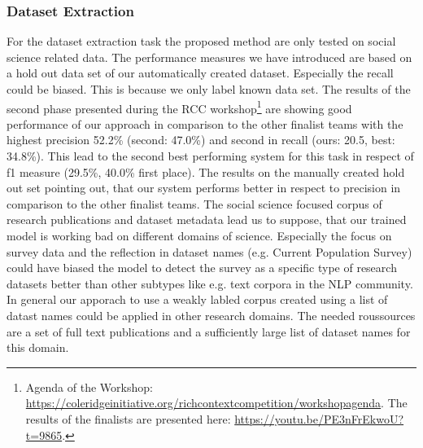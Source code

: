 \subsubsection{Dataset Extraction}
For the dataset extraction task the proposed method are only tested on social science related data.
The performance measures we have introduced are based on a hold out data set of our automatically created dataset.
Especially the recall could be biased.
This is because we only label known data set.
The results of the second phase presented during the RCC workshop\footnote{
    Agenda of the Workshop: 
    \url{https://coleridgeinitiative.org/richcontextcompetition/workshopagenda}.
    The results of the finalists are presented here: 
    \url{https://youtu.be/PE3nFrEkwoU?t=9865}.
}
are showing good performance of our approach in comparison to the other finalist teams with the highest precision 52.2\% (second: 47.0\%) and second in recall (ours: 20.5, best: 34.8\%).
This lead to the second best performing system for this task in respect of f1 measure (29.5\%, 40.0\% first place).
The results on the manually created hold out set pointing out, that our system performs better in respect to precision in comparison to the other finalist teams.
The social science focused corpus of research publications and dataset metadata lead us to suppose, that our trained model is working bad on different domains of science.
Especially the focus on survey data and the reflection in dataset names (e.g. Current Population Survey) could have biased the model to detect the survey as a specific type of research datasets better than other subtypes like e.g. text corpora in the NLP community.
In general our apporach to use a weakly labled corpus created using a list of datast names could be applied in other research domains.
The needed roussources are a set of full text publications and a sufficiently large list of dataset names for this domain.
\begin{comment}
* limitations\
**    Performance is difficult to measure\\
**    Ground truth needed to have a good measure\\
**    During development a ground truth holdout set would have prevented the feeling to fish in troubled waters.\\
\end{comment}

